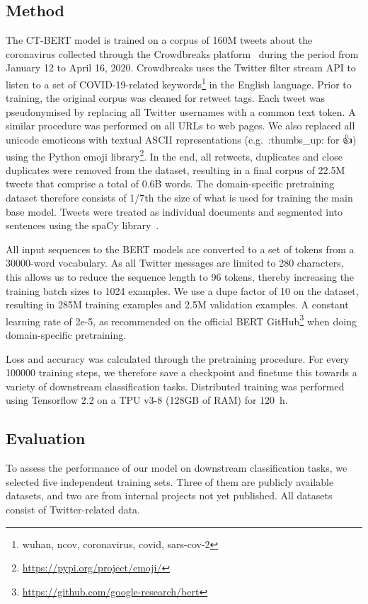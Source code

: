 \documentclass{article}
\begin{document}
\begin{multicols}{2}
\section{Method}
\label{sec:introduction}
The \textsc{CT-BERT} model is trained on a corpus of \num{160}M tweets about the coronavirus collected through the Crowdbreaks platform~\cite{muller2019crowdbreaks} during the period from January 12 to April 16, 2020.
Crowdbreaks uses the Twitter filter stream API to listen to a set of COVID-19-related keywords\footnote{wuhan, ncov, coronavirus, covid, sars-cov-2} in the English language.
Prior to training, the original corpus was cleaned for retweet tags.
Each tweet was pseudonymised by replacing all Twitter usernames with a common text token.
A similar procedure was performed on all URLs to web pages.
We also replaced all unicode emoticons with textual ASCII representations (e.g.\ :thumbs\_up: for 👍) using the Python emoji library\footnote{\url{https://pypi.org/project/emoji/}}.
In the end, all retweets, duplicates and close duplicates were removed from the dataset, resulting in a final corpus of 22.5M tweets that comprise a total of 0.6B words.
The domain-specific pretraining dataset therefore consists of 1/7th the size of what is used for training the main base model.
Tweets were treated as individual documents and segmented into sentences using the spaCy library~\cite{honnibal2017spacy}.

All input sequences to the BERT models are converted to a set of tokens from a \num{30000}-word vocabulary.
As all Twitter messages are limited to 280 characters, this allows us to reduce the sequence length to 96 tokens, thereby increasing the training batch sizes to \num{1024} examples.
We use a dupe factor of 10 on the dataset, resulting in 285M training examples and 2.5M validation examples.
A constant learning rate of 2e-5, as recommended on the official BERT GitHub\footnote{\url{https://github.com/google-research/bert}} when doing domain-specific pretraining.

Loss and accuracy was calculated through the pretraining procedure.
For every \num{100000} training steps, we therefore save a checkpoint and finetune this towards a variety of downstream classification tasks.
Distributed training was performed using Tensorflow 2.2 on a TPU v3-8 (128GB of RAM) for \SI{120}{\hour}.
\subsection{Evaluation}
To assess the performance of our model on downstream classification tasks, we selected five independent training sets.
Three of them are publicly available datasets, and two are from internal projects not yet published.
All datasets consist of Twitter-related data.


\end{multicols}
\end{document}
